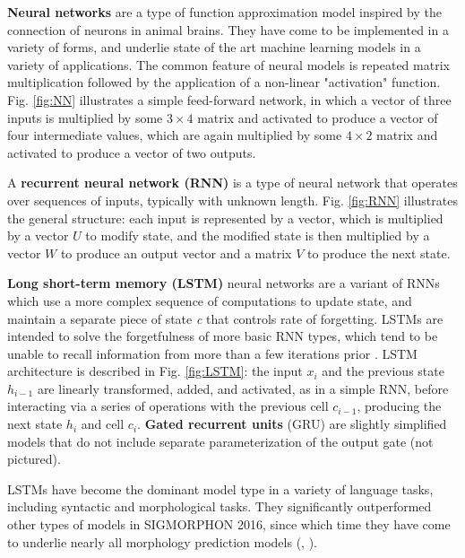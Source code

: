 \textbf{Neural networks} are a type of function approximation model inspired by the connection of neurons in animal brains. They have come to be implemented in a variety of forms, and underlie state of the art machine learning models in a variety of applications. The common feature of neural models is repeated matrix multiplication followed by the application of a non-linear "activation" function. Fig. \ref{fig:NN} illustrates a simple feed-forward network, in which a vector of three inputs is multiplied by some $3 \times 4$ matrix and activated to produce a vector of four intermediate values, which are again multiplied by some $4 \times 2$ matrix and activated to produce a vector of two outputs.

A \textbf{recurrent neural network (RNN)} is a type of neural network that operates over sequences of inputs, typically with unknown length. Fig. \ref{fig:RNN} illustrates the general structure: each input is represented by a vector, which is multiplied by a vector $U$ to modify state, and the modified state is then multiplied by a vector $W$ to produce an output vector and a matrix $V$ to produce the next state. 

\textbf{Long short-term memory (LSTM)} neural networks are a variant of RNNs which use a more complex sequence of computations to update state, and maintain a separate piece of state \textit{c} that controls rate of forgetting. LSTMs are intended to solve the forgetfulness of more basic RNN types, which tend to be unable to recall information from more than a few iterations prior \parencite{Hochreiter1997}. LSTM architecture is described in Fig. \ref{fig:LSTM}: the input $x_i$ and the previous state $h_{i-1}$ are linearly transformed, added, and activated, as in a simple RNN, before interacting via a series of operations with the previous cell $c_{i-1}$, producing the next state $h_i$ and cell $c_i$. \textbf{Gated recurrent units} (GRU) are slightly simplified models that do not include separate parameterization of the output gate (not pictured).

LSTMs have become the dominant model type in a variety of language tasks, including syntactic and morphological tasks. They significantly outperformed other types of models in SIGMORPHON 2016, since which time they have come to underlie nearly all morphology prediction models (\cite{Cotterell2016}, \cite{Cotterell2017a}).

